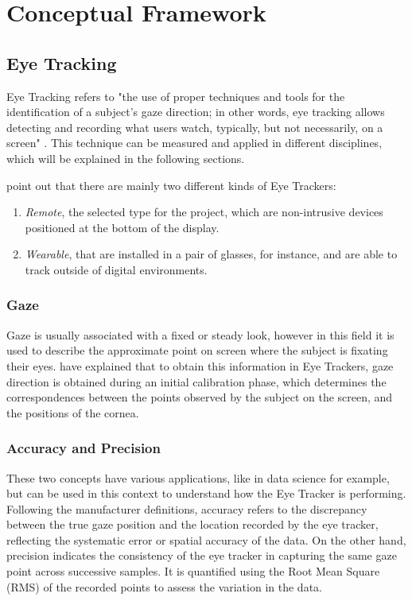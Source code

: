 \section{Conceptual Framework} 

\subsection{Eye Tracking}

Eye Tracking refers to "the use of proper techniques and tools for the identification of a subject's gaze direction; in other words, eye tracking allows detecting and recording what users watch, typically, but not necessarily, on a screen" \citep{cantoni2014eye}. This technique can be measured and applied in different disciplines, which will be explained in the following sections.

\cite{dondi2023gaze} point out that there are mainly two different kinds of Eye Trackers:
\begin{enumerate}
    \item \textit{Remote}, the selected type for the project, which are non-intrusive devices positioned at the bottom of the display.
    \item \textit{Wearable}, that are installed in a pair of glasses, for instance, and are able to track outside of digital environments.
\end{enumerate}

\subsubsection{Gaze}

Gaze is usually associated with a fixed or steady look, however in this field it is used to describe the approximate point on screen where the subject is fixating their eyes. \cite{cantoni2014eye} have explained that to obtain this information in Eye Trackers, gaze direction is obtained during an initial calibration phase, which determines the correspondences between the points observed by the subject on the screen, and the positions of the cornea. 

\subsubsection{Accuracy and Precision}

These two concepts have various applications, like in data science for example, but can be used in this context to understand how the Eye Tracker is performing. Following the manufacturer definitions, accuracy refers to the discrepancy between the true gaze position and the location recorded by the eye tracker, reflecting the systematic error or spatial accuracy of the data. On the other hand, precision indicates the consistency of the eye tracker in capturing the same gaze point across successive samples. It is quantified using the Root Mean Square (RMS) of the recorded points to assess the variation in the data. \citep{accuracy-precision-tobii}

